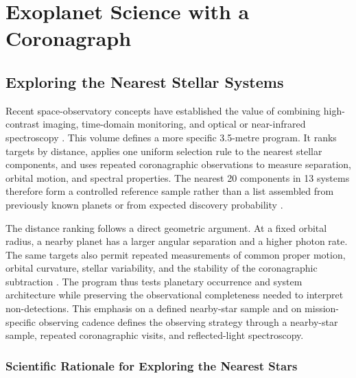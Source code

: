 \chapter{Exoplanet Science with a Coronagraph}\label{app:exoplanets}
\vspace{8mm}

\section{Exploring the Nearest Stellar Systems}
\label{sec:Nearest_system}

Recent space-observatory concepts have established the value of combining
high-contrast imaging, time-domain monitoring, and optical or near-infrared
spectroscopy \cite{roy2026III,wevers2026III}. This volume defines a more specific
3.5-metre program. It ranks targets by distance, applies one uniform
selection rule to the nearest stellar components, and uses repeated
coronagraphic observations to measure separation, orbital motion, and
spectral properties. The nearest 20 components in 13 systems therefore form
a controlled reference sample rather than a list assembled from previously
known planets or from expected discovery probability \cite{Henry2018,Gaia2022}.

The distance ranking follows a direct geometric argument. At a fixed orbital
radius, a nearby planet has a larger angular separation and a higher photon
rate. The same targets also permit repeated measurements of common proper
motion, orbital curvature, stellar variability, and the stability of the
coronagraphic subtraction \cite{Traub2010,Macintosh2015}. The program thus
tests planetary occurrence and system architecture while preserving the
observational completeness needed to interpret non-detections. This emphasis
on a defined nearby-star sample and on mission-specific observing cadence
defines the observing strategy through a nearby-star sample, repeated
coronagraphic visits, and reflected-light spectroscopy.

\subsection{Scientific Rationale for Exploring the Nearest Stars}
\label{sec:Rationale_Nearest}

